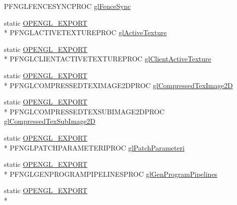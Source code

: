 \begin{DoxyCompactItemize}
P\+F\+N\+G\+L\+F\+E\+N\+C\+E\+S\+Y\+N\+C\+P\+R\+O\+C \hyperlink{class_agmd_1_1_g_l_driver_af877729750e7190ca2e5e2d91f22f9bc}{gl\+Fence\+Sync}
\item 
static \hyperlink{_config_8h_a77401aa3bc0a379879047c1bd30f262e}{O\+P\+E\+N\+G\+L\+\_\+\+E\+X\+P\+O\+R\+T} \\*
P\+F\+N\+G\+L\+A\+C\+T\+I\+V\+E\+T\+E\+X\+T\+U\+R\+E\+P\+R\+O\+C \hyperlink{class_agmd_1_1_g_l_driver_aada95c0d15103631bfb8103133e4355a}{gl\+Active\+Texture}
\item 
static \hyperlink{_config_8h_a77401aa3bc0a379879047c1bd30f262e}{O\+P\+E\+N\+G\+L\+\_\+\+E\+X\+P\+O\+R\+T} \\*
P\+F\+N\+G\+L\+C\+L\+I\+E\+N\+T\+A\+C\+T\+I\+V\+E\+T\+E\+X\+T\+U\+R\+E\+P\+R\+O\+C \hyperlink{class_agmd_1_1_g_l_driver_a785811c63342ccb09d901f2565224ff9}{gl\+Client\+Active\+Texture}
\item 
static \hyperlink{_config_8h_a77401aa3bc0a379879047c1bd30f262e}{O\+P\+E\+N\+G\+L\+\_\+\+E\+X\+P\+O\+R\+T} \\*
P\+F\+N\+G\+L\+C\+O\+M\+P\+R\+E\+S\+S\+E\+D\+T\+E\+X\+I\+M\+A\+G\+E2\+D\+P\+R\+O\+C \hyperlink{class_agmd_1_1_g_l_driver_aad80ab48927af4495c8f2449b670a632}{gl\+Compressed\+Tex\+Image2\+D}
\item 
static \hyperlink{_config_8h_a77401aa3bc0a379879047c1bd30f262e}{O\+P\+E\+N\+G\+L\+\_\+\+E\+X\+P\+O\+R\+T} \\*
P\+F\+N\+G\+L\+C\+O\+M\+P\+R\+E\+S\+S\+E\+D\+T\+E\+X\+S\+U\+B\+I\+M\+A\+G\+E2\+D\+P\+R\+O\+C \hyperlink{class_agmd_1_1_g_l_driver_a12a98a79ac6f93390f7ee635930c505e}{gl\+Compressed\+Tex\+Sub\+Image2\+D}
\item 
static \hyperlink{_config_8h_a77401aa3bc0a379879047c1bd30f262e}{O\+P\+E\+N\+G\+L\+\_\+\+E\+X\+P\+O\+R\+T} \\*
P\+F\+N\+G\+L\+P\+A\+T\+C\+H\+P\+A\+R\+A\+M\+E\+T\+E\+R\+I\+P\+R\+O\+C \hyperlink{class_agmd_1_1_g_l_driver_a41d54179c869685cd5b2f83fd6288d8d}{gl\+Patch\+Parameteri}
\item 
static \hyperlink{_config_8h_a77401aa3bc0a379879047c1bd30f262e}{O\+P\+E\+N\+G\+L\+\_\+\+E\+X\+P\+O\+R\+T} \\*
P\+F\+N\+G\+L\+G\+E\+N\+P\+R\+O\+G\+R\+A\+M\+P\+I\+P\+E\+L\+I\+N\+E\+S\+P\+R\+O\+C \hyperlink{class_agmd_1_1_g_l_driver_a63ba03961f9754fc7e8cdb075fb985c3}{gl\+Gen\+Program\+Pipelines}
\item 
static \hyperlink{_config_8h_a77401aa3bc0a379879047c1bd30f262e}{O\+P\+E\+N\+G\+L\+\_\+\+E\+X\+P\+O\+R\+T} \\*

\end{DoxyCompactItemize}
